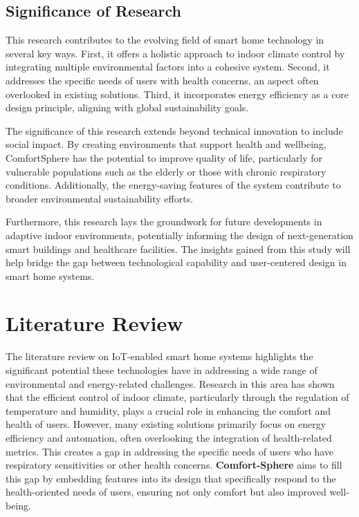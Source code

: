 \documentclass[a4paper]{scrartcl}
\begin{document}
    \subsection{Significance of Research}
    This research contributes to the evolving field of smart home technology in several key ways. First, it offers a holistic approach to indoor climate control by integrating multiple environmental factors into a cohesive system. Second, it addresses the specific needs of users with health concerns, an aspect often overlooked in existing solutions. Third, it incorporates energy efficiency as a core design principle, aligning with global sustainability goals.
    
    The significance of this research extends beyond technical innovation to include social impact. By creating environments that support health and wellbeing, ComfortSphere has the potential to improve quality of life, particularly for vulnerable populations such as the elderly or those with chronic respiratory conditions. Additionally, the energy-saving features of the system contribute to broader environmental sustainability efforts.
    
    Furthermore, this research lays the groundwork for future developments in adaptive indoor environments, potentially informing the design of next-generation smart buildings and healthcare facilities. The insights gained from this study will help bridge the gap between technological capability and user-centered design in smart home systems.

	\section{Literature Review}
	\label{sec:Literature Review}
	The literature review on IoT-enabled smart home systems highlights the significant potential these technologies have in addressing a wide range of environmental and energy-related challenges. Research in this area has shown that the efficient control of indoor climate, particularly through the regulation of temperature and humidity, plays a crucial role in enhancing the comfort and health of users. However, many existing solutions primarily focus on energy efficiency and automation, often overlooking the integration of health-related metrics. This creates a gap in addressing the specific needs of users who have respiratory sensitivities or other health concerns. \textbf{Comfort-Sphere} aims to fill this gap by embedding features into its design that specifically respond to the health-oriented needs of users, ensuring not only comfort but also improved well-being.
\end{document}
